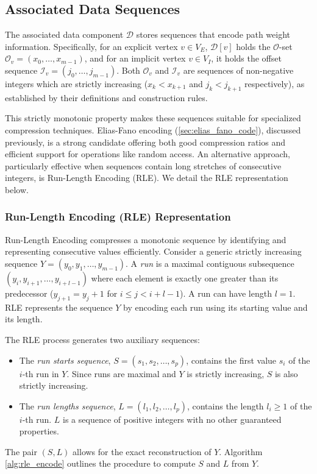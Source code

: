 \subsection{Associated Data Sequences}
\label{subsec:compressing_associated_data_sequences}

The associated data component $\mathcal{D}$ stores sequences that encode path weight information. Specifically, for an explicit vertex $v \in V_E$, $\mathcal{D}[v]$ holds the $\mathcal{O}$-set $\mathcal{O}_v = (x_0, \dots, x_{m-1})$, and for an implicit vertex $v \in V_I$, it holds the offset sequence $\mathcal{I}_v = (j_0, \dots, j_{m-1})$. Both $\mathcal{O}_v$ and $\mathcal{I}_v$ are sequences of non-negative integers which are strictly increasing ($x_k < x_{k+1}$ and $j_k < j_{k+1}$ respectively), as established by their definitions and construction rules.

This strictly monotonic property makes these sequences suitable for specialized compression techniques. Elias-Fano encoding (\autoref{sec:elias_fano_code}), discussed previously, is a strong candidate offering both good compression ratios and efficient support for operations like random access. An alternative approach, particularly effective when sequences contain long stretches of consecutive integers, is Run-Length Encoding (RLE). We detail the RLE representation below.

\subsubsection*{Run-Length Encoding (RLE) Representation}
Run-Length Encoding compresses a monotonic sequence by identifying and representing consecutive values efficiently. Consider a generic strictly increasing sequence $Y = (y_0, y_1, \dots, y_{m-1})$. A \emph{run} is a maximal contiguous subsequence $(y_i, y_{i+1}, \dots, y_{i+l-1})$ where each element is exactly one greater than its predecessor ($y_{j+1} = y_j + 1$ for $i \le j < i+l-1$). A run can have length $l=1$. RLE represents the sequence $Y$ by encoding each run using its starting value and its length.

The RLE process generates two auxiliary sequences:
\begin{itemize}
    \item The \emph{run starts sequence}, $S = (s_1, s_2, \dots, s_p)$, contains the first value $s_i$ of the $i$-th run in $Y$. Since runs are maximal and $Y$ is strictly increasing, $S$ is also strictly increasing.
    \item The \emph{run lengths sequence}, $L = (l_1, l_2, \dots, l_p)$, contains the length $l_i \ge 1$ of the $i$-th run. $L$ is a sequence of positive integers with no other guaranteed properties.
\end{itemize}
The pair $(S, L)$ allows for the exact reconstruction of $Y$. Algorithm \ref{alg:rle_encode} outlines the procedure to compute $S$ and $L$ from $Y$.

